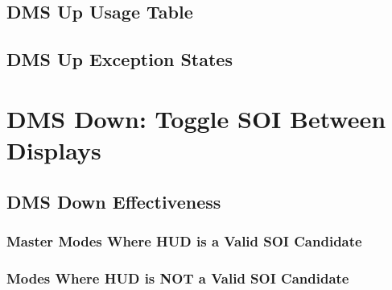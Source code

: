 \documentclass[11pt, a4paper, twoside]{report}
\begin{document}
\subsection{DMS Up Usage Table}
\label{sec:C3-S2-S2}

\subsection{DMS Up Exception States}
\label{sec:C3-S2-S3}

\section{DMS Down: Toggle SOI Between Displays}
\label{sec:C3-S3}

\subsection{DMS Down Effectiveness}
\label{sec:C3-S3-S1}

\subsubsection{Master Modes Where HUD is a Valid SOI Candidate}
\label{sec:C3-S3-S1-S1}

\subsubsection{Modes Where HUD is NOT a Valid SOI Candidate}
\label{sec:C3-S3-S1-S2}
\end{document}
